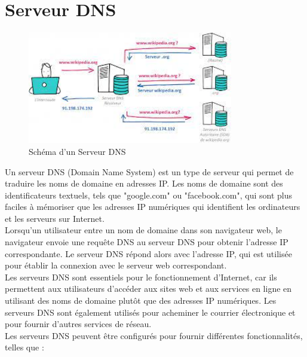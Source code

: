  \section{Serveur DNS} 
	\begin{figure}[h]
		\begin{center}
	\includegraphics[width=0.8\textwidth]{PhotoMemoire/serveur_dns.jpeg}
	\caption{Schéma d'un Serveur DNS\cite{7}}
\end{center}
\end{figure}

Un serveur DNS (Domain Name System) est un type de serveur qui permet de traduire les noms de domaine en adresses IP. Les noms de domaine sont des identificateurs textuels, tels que "google.com" ou "facebook.com", qui sont plus faciles à mémoriser que les adresses IP numériques qui identifient les ordinateurs et les serveurs sur Internet.\\

Lorsqu'un utilisateur entre un nom de domaine dans son navigateur web, le navigateur envoie une requête DNS au serveur DNS pour obtenir l'adresse IP correspondante. Le serveur DNS répond alors avec l'adresse IP, qui est utilisée pour établir la connexion avec le serveur web correspondant.\\

Les serveurs DNS sont essentiels pour le fonctionnement d'Internet, car ils permettent aux utilisateurs d'accéder aux sites web et aux services en ligne en utilisant des noms de domaine plutôt que des adresses IP numériques. Les serveurs DNS sont également utilisés pour acheminer le courrier électronique et pour fournir d'autres services de réseau.\\

Les serveurs DNS peuvent être configurés pour fournir différentes fonctionnalités, telles que :


